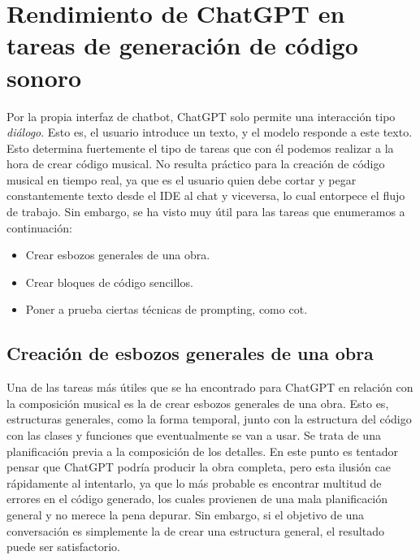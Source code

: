 \section{Rendimiento de ChatGPT en tareas de generación de código sonoro}
Por la propia interfaz de chatbot, ChatGPT solo permite una interacción tipo \emph{diálogo}. Esto es, el usuario introduce un texto, y el modelo responde a este texto. Esto determina fuertemente el tipo de tareas que con él podemos realizar a la hora de crear código musical. No resulta práctico para la creación de código musical en tiempo real, ya que es el usuario quien debe cortar y pegar constantemente texto desde el IDE al chat y viceversa, lo cual entorpece el flujo de trabajo. Sin embargo, se ha visto muy útil para las tareas que enumeramos a continuación:

\begin{itemize}
    \item Crear esbozos generales de una obra.
    \item Crear bloques de código sencillos.
    \item Poner a prueba ciertas técnicas de prompting, como \gls{cot}.
\end{itemize}

\subsection{Creación de esbozos generales de una obra}
Una de las tareas más útiles que se ha encontrado para ChatGPT en relación con la composición musical es la de crear esbozos generales de una obra. Esto es, estructuras generales, como la forma temporal, junto con la estructura del código con las clases y funciones que eventualmente se van a usar. Se trata de una planificación previa a la composición de los detalles. En este punto es tentador pensar que ChatGPT podría producir la obra completa, pero esta ilusión cae rápidamente al intentarlo, ya que lo más probable es encontrar multitud de errores en el código generado, los cuales provienen de una mala planificación general y no merece la pena depurar. Sin embargo, si el objetivo de una conversación es simplemente la de crear una estructura general, el resultado puede ser satisfactorio.

